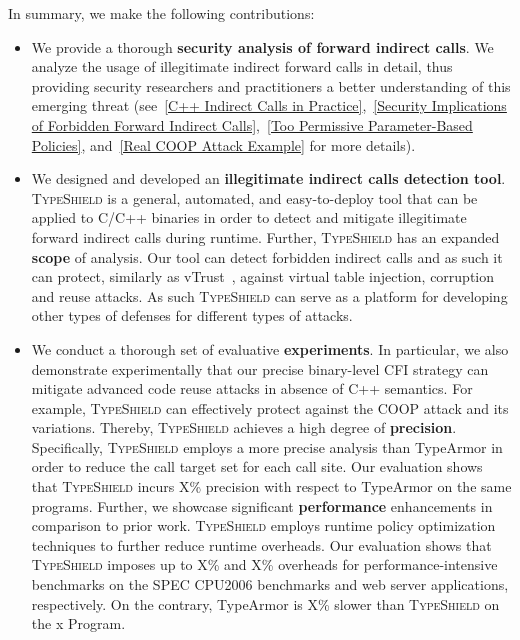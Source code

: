 In summary, we make the following contributions:
\label{Contribution}
\begin{itemize}[leftmargin=.12in]
 \item We provide a thorough \textbf{security analysis of forward indirect calls}. We analyze the usage of illegitimate indirect forward calls in detail, 
 thus providing security researchers and practitioners a better understanding of this emerging threat 
 (see~\ref{C++ Indirect Calls in Practice},~\ref{Security Implications of Forbidden Forward Indirect Calls},~\ref{Too Permissive Parameter-Based Policies},
 and~\ref{Real COOP Attack Example} for more details).

 \item We designed and developed an \textbf{illegitimate indirect calls detection tool}. \textsc{TypeShield} is a general, automated, and easy-to-deploy 
 tool that can be applied to C/C++ binaries in order to detect and mitigate illegitimate forward indirect calls  during runtime. 
 Further, \textsc{TypeShield} has an expanded \textbf{scope} of analysis. Our tool can detect forbidden indirect calls and as such it can protect, 
 similarly as vTrust~\cite{zhang:vtrust}, against virtual table injection, corruption and reuse attacks. As such \textsc{TypeShield} can serve as a 
 platform for developing other types of defenses for different types of attacks.
 
 \item We conduct a thorough set of evaluative \textbf{experiments}. In particular, we also demonstrate experimentally that our precise binary-level 
 CFI strategy can mitigate advanced code reuse attacks in absence of C++ semantics. For example, \textsc{TypeShield} can effectively protect against 
 the COOP attack and its variations. Thereby, \textsc{TypeShield} achieves a high degree of \textbf{precision}. Specifically, \textsc{TypeShield} 
 employs a more precise analysis than TypeArmor in order to reduce the call target set for each call site. Our evaluation shows that \textsc{TypeShield}
 incurs X\% precision with respect to TypeArmor on the same programs. Further, we showcase significant \textbf{performance} enhancements in 
 comparison to prior work. \textsc{TypeShield} employs runtime policy optimization techniques to further reduce runtime overheads. Our evaluation 
 shows that \textsc{TypeShield} imposes up to X\% and X\% overheads for performance-intensive benchmarks on the SPEC CPU2006 benchmarks and web 
 server applications, respectively. 
 On the contrary, TypeArmor is X\% slower than \textsc{TypeShield} on the x Program.

\end{itemize}


